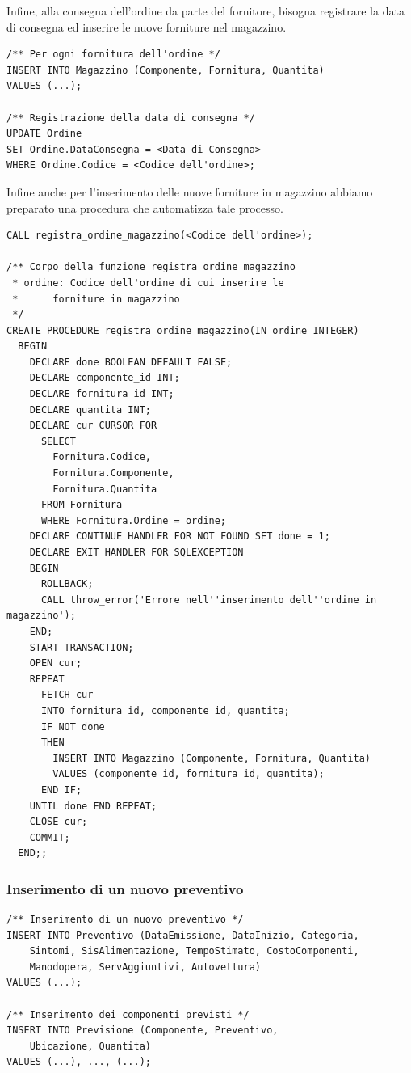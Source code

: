 				Infine, alla consegna dell'ordine da parte del fornitore, bisogna registrare la data di consegna ed inserire le nuove forniture nel magazzino.

				\begin{lstlisting}
/** Per ogni fornitura dell'ordine */
INSERT INTO Magazzino (Componente, Fornitura, Quantita)
VALUES (...);

/** Registrazione della data di consegna */
UPDATE Ordine
SET Ordine.DataConsegna = <Data di Consegna>
WHERE Ordine.Codice = <Codice dell'ordine>;
				\end{lstlisting}

				Infine anche per l'inserimento delle nuove forniture in magazzino abbiamo preparato una procedura che automatizza tale processo.

				\begin{lstlisting}
CALL registra_ordine_magazzino(<Codice dell'ordine>);

/** Corpo della funzione registra_ordine_magazzino
 * ordine: Codice dell'ordine di cui inserire le
 * 		forniture in magazzino 
 */
CREATE PROCEDURE registra_ordine_magazzino(IN ordine INTEGER)
  BEGIN
    DECLARE done BOOLEAN DEFAULT FALSE;
    DECLARE componente_id INT;
    DECLARE fornitura_id INT;
    DECLARE quantita INT;
    DECLARE cur CURSOR FOR
      SELECT
        Fornitura.Codice,
        Fornitura.Componente,
        Fornitura.Quantita
      FROM Fornitura
      WHERE Fornitura.Ordine = ordine;
    DECLARE CONTINUE HANDLER FOR NOT FOUND SET done = 1;
    DECLARE EXIT HANDLER FOR SQLEXCEPTION
    BEGIN
      ROLLBACK;
      CALL throw_error('Errore nell''inserimento dell''ordine in magazzino');
    END;
    START TRANSACTION;
    OPEN cur;
    REPEAT
      FETCH cur
      INTO fornitura_id, componente_id, quantita;
      IF NOT done
      THEN
        INSERT INTO Magazzino (Componente, Fornitura, Quantita)
        VALUES (componente_id, fornitura_id, quantita);
      END IF;
    UNTIL done END REPEAT;
    CLOSE cur;
    COMMIT;
  END;;
				\end{lstlisting}


			\subsubsection{Inserimento di un nuovo preventivo}

				\begin{lstlisting}
/** Inserimento di un nuovo preventivo */
INSERT INTO Preventivo (DataEmissione, DataInizio, Categoria,
	Sintomi, SisAlimentazione, TempoStimato, CostoComponenti, 
	Manodopera, ServAggiuntivi, Autovettura)
VALUES (...);

/** Inserimento dei componenti previsti */
INSERT INTO Previsione (Componente, Preventivo, 
	Ubicazione, Quantita)
VALUES (...), ..., (...);
				\end{lstlisting}

